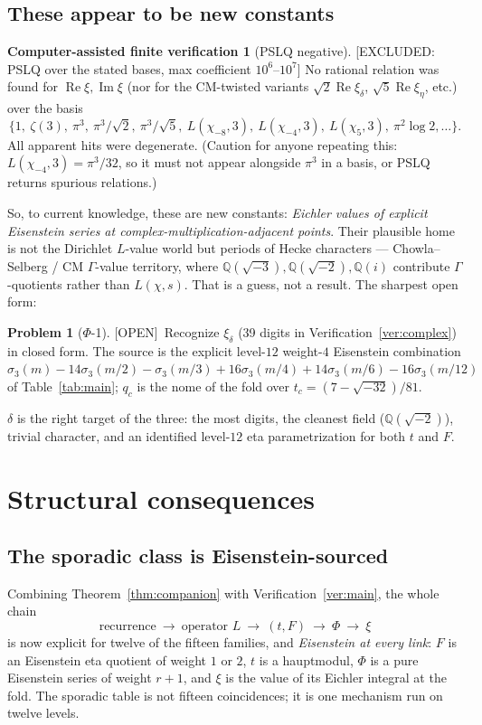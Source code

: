 \documentclass[11pt,reqno]{amsart}
\theoremstyle{plain}
\theoremstyle{definition}
\newtheorem{verification}[theorem]{Computer-assisted finite verification}
\newtheorem{problem}[theorem]{Problem}
\theoremstyle{remark}
\newcommand{\Q}{\mathbb{Q}}
\newcommand{\chim}[1]{\chi_{-#1}}
\newcommand{\ExcludedR}[1]{\textup{\textsf{[EXCLUDED: #1]}}}
\newcommand{\Open}{\textup{\textsf{[OPEN]}}}
\begin{document}
\subsection{These appear to be new constants}
\begin{verification}[PSLQ negative]\label{ver:pslq}
\ExcludedR{PSLQ over the stated bases, max coefficient $10^{6}$--$10^{7}$}
No rational relation was found for
$\operatorname{Re}\xi,\operatorname{Im}\xi$ (nor for the CM-twisted variants
$\sqrt2\operatorname{Re}\xi_\delta$, $\sqrt5\operatorname{Re}\xi_\eta$,
etc.) over the basis
\[
\{1,\ \zeta(3),\ \pi^3,\ \pi^3/\sqrt2,\ \pi^3/\sqrt5,\ L(\chi_{-8},3),\
L(\chim4,3),\ L(\chi_5,3),\ \pi^2\log2,\dots\}.
\]
All apparent hits were degenerate. (Caution for anyone repeating this:
$L(\chim4,3)=\pi^3/32$, so it must not appear alongside $\pi^3$ in a
basis, or PSLQ returns spurious relations.)
\end{verification}

So, to current knowledge, these are new constants: \emph{Eichler values of
explicit Eisenstein series at complex-multiplication-adjacent points}. Their
plausible home is not the Dirichlet $L$-value world but periods of Hecke
characters --- Chowla--Selberg / CM $\Gamma$-value territory, where
$\Q(\sqrt{-3}),\Q(\sqrt{-2}),\Q(i)$ contribute $\Gamma$-quotients rather
than $L(\chi,s)$. That is a guess, not a result. The sharpest open form:

\begin{problem}[$\Phi$-1]\label{prob:phi1}
\Open\ Recognize $\xi_\delta$ (39 digits in Verification~\ref{ver:complex})
in closed form. The source is the explicit level-$12$ weight-$4$ Eisenstein
combination
$\sigma_3(m)-14\sigma_3(m/2)-\sigma_3(m/3)+16\sigma_3(m/4)
+14\sigma_3(m/6)-16\sigma_3(m/12)$
of Table~\ref{tab:main}; $q_c$ is the nome of the fold over
$t_c=(7-\sqrt{-32})/81$.
\end{problem}

$\delta$ is the right target of the three: the most digits, the cleanest
field ($\Q(\sqrt{-2})$), trivial character, and an identified level-$12$
eta parametrization for both $t$ and $F$.

\section{Structural consequences}
\label{sec:structure}

\subsection{The sporadic class is Eisenstein-sourced}
Combining Theorem~\ref{thm:companion} with Verification~\ref{ver:main}, the
whole chain
\[
\text{recurrence}\ \longrightarrow\ \text{operator }L\
\longrightarrow\ (t,F)\ \longrightarrow\ \Phi\ \longrightarrow\ \xi
\]
is now explicit for twelve of the fifteen families, and \emph{Eisenstein at
every link}: $F$ is an Eisenstein eta quotient of weight $1$ or $2$, $t$ is
a hauptmodul, $\Phi$ is a pure Eisenstein series of weight $r+1$, and $\xi$
is the value of its Eichler integral at the fold. The sporadic table is not
fifteen coincidences; it is one mechanism run on twelve levels.
\end{document}
